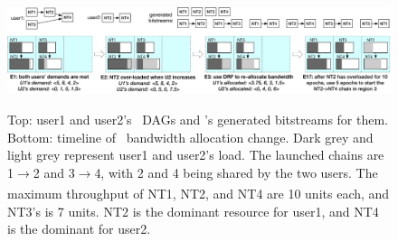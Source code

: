{
\begin{figure}
\begin{center}
\centerline{\includegraphics[width=\textwidth]{snic/Figures/nt-example.pdf}}
{
Top: user1 and user2's \nt\ DAGs and \snic's generated bitstreams for them.
Bottom: timeline of \nt\ bandwidth allocation change.
Dark grey and light grey represent user1 and user2's load.
The launched chains are \nt{}1$\xrightarrow[]{}$\nt{}2 and \nt{}3$\xrightarrow[]{}$\nt{}4,
with \nt{}2 and \nt{}4 being shared by the two users.
The maximum throughput of NT1, NT2, and NT4 are 10 units each, and NT3's is 7 units.
NT2 is the dominant resource for user1, and NT4 is the dominant for user2.
}
\end{center}
\end{figure}
}
